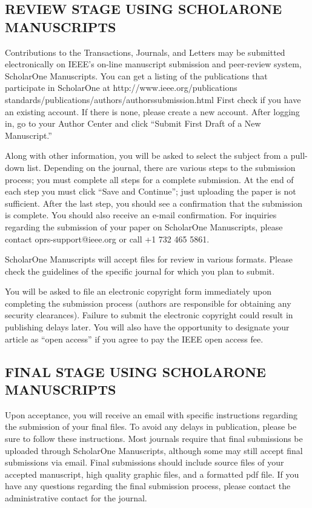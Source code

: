 \documentclass{IEEEoj}
\begin{document}
\subsection{REVIEW STAGE USING SCHOLARONE{\textregistered} MANUSCRIPTS}
Contributions to the Transactions, Journals, and Letters may be submitted 
electronically on IEEE's on-line manuscript submission and peer-review 
system, ScholarOne{\textregistered} Manuscripts. You can get a 
listing of the publications that participate in ScholarOne at 
http://www.ieee.org/\discretionary{}{}{}publications\textunderscore 
standards/publications/authors/authors\textunderscore\break submission.html First 
check if you have an existing account. If there is none, please create a new 
account. After logging in, go to your Author Center and click ``Submit First 
Draft of a New Manuscript.'' 

Along with other information, you will be asked to select the subject from a 
pull-down list. Depending on the journal, there are various steps to the 
submission process; you must complete all steps for a complete submission. 
At the end of each step you must click ``Save and Continue''; just uploading 
the paper is not sufficient. After the last step, you should see a 
confirmation that the submission is complete. You should also receive an 
e-mail confirmation. For inquiries regarding the submission of your paper on 
ScholarOne Manuscripts, please contact oprs-support@ieee.org or call +1 
732 465 5861.

ScholarOne Manuscripts will accept files for review in various formats. 
Please check the guidelines of the specific journal for which you plan to 
submit. 

You will be asked to file an electronic copyright form immediately upon 
completing the submission process (authors are responsible for obtaining any 
security clearances). Failure to submit the electronic copyright could 
result in publishing delays later. You will also have the opportunity to 
designate your article as ``open access'' if you agree to pay the IEEE open 
access fee. 

\subsection{FINAL STAGE USING SCHOLARONE MANUSCRIPTS}
Upon acceptance, you will receive an email with specific instructions 
regarding the submission of your final files. To avoid any delays in 
publication, please be sure to follow these instructions. Most journals 
require that final submissions be uploaded through ScholarOne Manuscripts, 
although some may still accept final submissions via email. Final 
submissions should include source files of your accepted manuscript, high 
quality graphic files, and a formatted pdf file. If you have any questions 
regarding the final submission process, please contact the administrative 
contact for the journal. 
\end{document}
